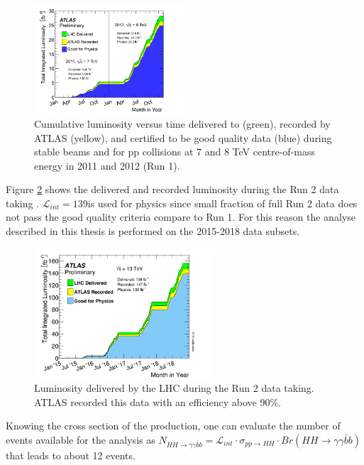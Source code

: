 \begin{figure}[htbp]
    \centering
    \includegraphics[width=0.5\textwidth]{Ch2/Img/LumiRun1.png}
    \caption{Cumulative luminosity versus time delivered to (green), recorded by ATLAS (yellow), and certified to be good quality data (blue) during stable beams and for pp collisions at 7 and 8 TeV centre-of-mass energy in 2011 and 2012 (Run 1).}
    \label{fig:chap2:LHC:Lumi:Run1}
\end{figure}
Figure \ref{fig:chap2:LHC:Lumi} shows the delivered and recorded luminosity during the Run 2 data taking \cite{Lumi2018}. $\mathcal{L}_{int} = 139$\ifb is used for physics since small fraction of full Run 2 data does not pass the good quality criteria compare to Run 1. For this reason the analyse described in this thesis is performed on the 2015-2018 data subsets.\\
\begin{figure}[htbp]
    \centering
    \includegraphics[width=0.6\textwidth]{Ch2/Img/Lumi.png}
    \caption{Luminosity delivered by the LHC during the Run 2 data taking. ATLAS recorded this data with an efficiency above 90\%.}
    \label{fig:chap2:LHC:Lumi}
\end{figure}
Knowing the cross section of the \HHyybb production, one can evaluate the number of events available for the analysis as $N_{HH\rightarrow\gamma\gamma\bar{b}b} = \mathcal{L}_{int}\cdot\sigma_{pp\rightarrow HH}\cdot Br(HH\rightarrow\gamma\gamma\bar{b}b)$ that leads to about 12 events.
